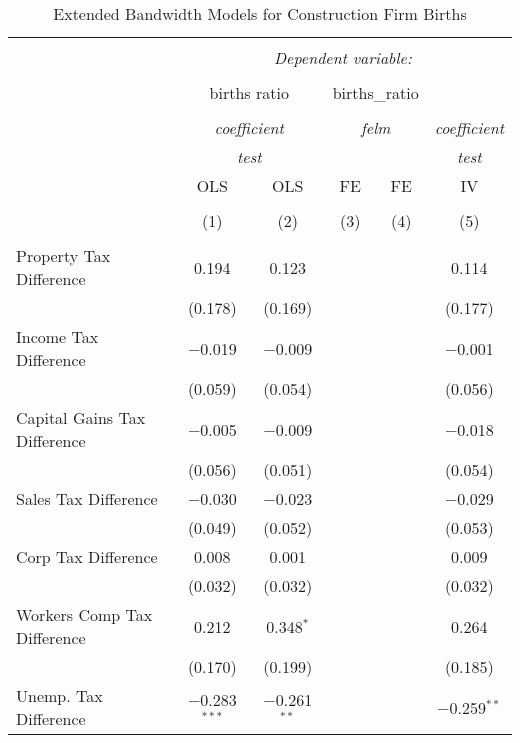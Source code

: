 
\begin{table}[!htbp] \centering 
  \caption{Extended Bandwidth Models for  Construction Firm Births} 
  \label{} 
\begin{tabular}{@{\extracolsep{5pt}}lccccc} 
\\[-1.8ex]\hline 
\hline \\[-1.8ex] 
 & \multicolumn{5}{c}{\textit{Dependent variable:}} \\ 
\cline{2-6} 
\\[-1.8ex] & \multicolumn{2}{c}{births ratio} & \multicolumn{2}{c}{births\_ratio} &   \\ 
\\[-1.8ex] & \multicolumn{2}{c}{\textit{coefficient}} & \multicolumn{2}{c}{\textit{felm}} & \textit{coefficient} \\ 
 & \multicolumn{2}{c}{\textit{test}} & \multicolumn{2}{c}{\textit{}} & \textit{test} \\ 
 & OLS & OLS & FE & FE & IV \\ 
\\[-1.8ex] & (1) & (2) & (3) & (4) & (5)\\ 
\hline \\[-1.8ex] 
 Property Tax Difference & 0.194 & 0.123 &  &  & 0.114 \\ 
  & (0.178) & (0.169) &  &  & (0.177) \\ 
  Income Tax Difference & $-$0.019 & $-$0.009 &  &  & $-$0.001 \\ 
  & (0.059) & (0.054) &  &  & (0.056) \\ 
  Capital Gains Tax Difference & $-$0.005 & $-$0.009 &  &  & $-$0.018 \\ 
  & (0.056) & (0.051) &  &  & (0.054) \\ 
  Sales Tax Difference & $-$0.030 & $-$0.023 &  &  & $-$0.029 \\ 
  & (0.049) & (0.052) &  &  & (0.053) \\ 
  Corp Tax Difference & 0.008 & 0.001 &  &  & 0.009 \\ 
  & (0.032) & (0.032) &  &  & (0.032) \\ 
  Workers Comp Tax Difference & 0.212 & 0.348$^{*}$ &  &  & 0.264 \\ 
  & (0.170) & (0.199) &  &  & (0.185) \\ 
  Unemp. Tax Difference & $-$0.283$^{***}$ & $-$0.261$^{**}$ &  &  & $-$0.259$^{**}$ \\ 

\end{tabular}
\end{table}
